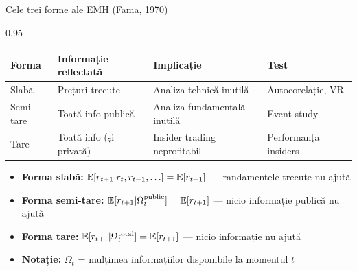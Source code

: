 \documentclass[9pt, aspectratio=169, t]{beamer}
\begin{document}
\begin{frame}{Cele trei forme ale EMH (Fama, 1970)}
\begin{cminipage}{0.95\textwidth}
    \renewcommand{\arraystretch}{1.3}
    \begin{center}
    \begin{tabular}{llll}
    \toprule
    \textbf{Forma} & \textbf{Informație reflectată} & \textbf{Implicație} & \textbf{Test} \\
    \midrule
    Slabă & Prețuri trecute & Analiza tehnică inutilă & Autocorelație, VR \\
    Semi-tare & Toată info publică & Analiza fundamentală inutilă & Event study \\
    Tare & Toată info (și privată) & Insider trading neprofitabil & Performanța insiders \\
    \bottomrule
    \end{tabular}
    \end{center}

    \vspace{0.2cm}
    \begin{itemize}\setlength{\itemsep}{0pt}
        \item \textbf{Forma slabă:} $\mathbb{E}[r_{t+1} | r_t, r_{t-1}, \ldots] = \mathbb{E}[r_{t+1}]$ --- randamentele trecute nu ajută
        \item \textbf{Forma semi-tare:} $\mathbb{E}[r_{t+1} | \Omega_t^{\text{public}}] = \mathbb{E}[r_{t+1}]$ --- nicio informație publică nu ajută
        \item \textbf{Forma tare:} $\mathbb{E}[r_{t+1} | \Omega_t^{\text{total}}] = \mathbb{E}[r_{t+1}]$ --- nicio informație nu ajută
        \item \textbf{Notație:} $\Omega_t$ = mulțimea informațiilor disponibile la momentul $t$
    \end{itemize}
\end{cminipage}
\end{frame}
\end{document}
